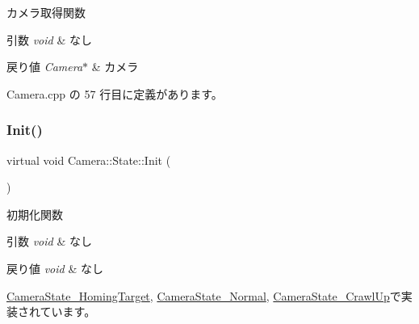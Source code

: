 カメラ取得関数 


\begin{DoxyParams}{引数}
{\em void} & なし \\
\hline
\end{DoxyParams}

\begin{DoxyRetVals}{戻り値}
{\em Camera$\ast$} & カメラ \\
\hline
\end{DoxyRetVals}


 Camera.\+cpp の 57 行目に定義があります。

\mbox{\label{class_camera_1_1_state_a11627f91e7dc5085d3cbb8841747a778}} 
\subsubsection{\texorpdfstring{Init()}{Init()}}
{\footnotesize\ttfamily virtual void Camera\+::\+State\+::\+Init (\begin{DoxyParamCaption}{ }\end{DoxyParamCaption})\hspace{0.3cm}{\ttfamily [pure virtual]}}



初期化関数 


\begin{DoxyParams}{引数}
{\em void} & なし \\
\hline
\end{DoxyParams}

\begin{DoxyRetVals}{戻り値}
{\em void} & なし \\
\hline
\end{DoxyRetVals}


\mbox{\hyperlink{class_camera_state___homing_target_aaf95e93c2036a280bbc0a6a9a7df6b37}{Camera\+State\+\_\+\+Homing\+Target}}, \mbox{\hyperlink{class_camera_state___normal_a9e08312abffe36e42e53decdd015f079}{Camera\+State\+\_\+\+Normal}}, \mbox{\hyperlink{class_camera_state___crawl_up_a5b0ed82fd39c7dfe46e36ab151dcd2a1}{Camera\+State\+\_\+\+Crawl\+Up}}で実装されています。

\mbox{\label{class_camera_1_1_state_a3c95f7df7651ddca8596686a118eb725}} 
